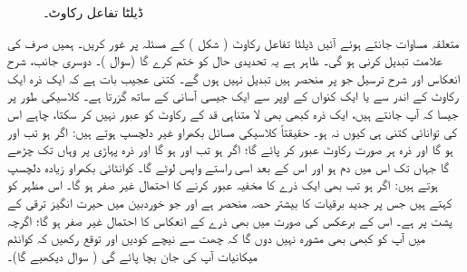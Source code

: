  \begin{figure}
\centering
{}
\caption{ڈیلٹا تفاعل رکاوٹ۔}
\label{شکل_غیر_تابع_ڈیلٹا_تفاعل_رکاوٹ}
\end{figure}
متعلقہ مساوات جانتے ہوئے  آئیں ڈیلٹا تفاعل  رکاوٹ ( شکل ) کے مسئلہ پر غور کریں۔ ہمیں صرف   کی علامت تبدیل کرنی   ہو گی۔ ظاہر ہے یہ تحدیدی حال کو ختم کرے گا  (سوال )۔  دوسری جانب،   شرح  انعکاس اور شرح  ترسیل جو  پر منحصر  ہیں تبدیل نہیں ہوں گے۔ کتنی عجیب بات ہے کہ ایک ذرہ ایک رکاوٹ کے اندر سے یا ایک کنواں  کے اوپر سے ایک  جیسی  آسانی کے ساتھ گزرتا ہے۔   کلاسیکی طور پر جیسا کہ آپ جانتے ہیں،  ایک ذرہ کبھی بھی لا متناہی  قد کے رکاوٹ کو عبور نہیں کر سکتا،  چاہے اس کی توانائی کتنی ہی کیوں نہ ہو۔    حقیقتاً  کلاسیکی مسائل بکھراو  غیر دلچسپ ہوتے ہیں:  اگر   ہو تب  اور  ہو گا اور ذرہ ہر صورت رکاوٹ عبور کر پائے گا؛  اگر    ہو تب   اور  ہو گا اور ذرہ  پہاڑی پر وہاں تک چڑھے گا جہاں تک اس میں دم ہو  اور اس  کے بعد اسی راستے واپس لوٹے گا۔  کوانٹائی بکھراو  زیادہ دلچسپ ہوتے ہیں:    اگر    ہو تب بھی ایک  ذرے کا مخفیہ  عبور کرنے کا احتمال غیر صفر ہو گا۔ اس مظہر کو    کہتے ہیں جس پر جدید برقیات کا بیشتر حصہ منحصر ہے اور جو خوردبین میں حیرت انگیز  ترقی کے پشت پر ہے۔  اس کے برعکس   کی صورت میں  بھی ذرے کے انعکاس کا احتمال  غیر صفر   ہو گا؛  اگرچہ میں آپ کو کبھی بھی مشورہ نہیں دوں گا کہ چھت سے نیچے کودیں اور توقع رکھیں کہ کوانٹم میکانیات آپ کی جان بچا  پائے  گی ( سوال   دیکھیے گا)۔
 
